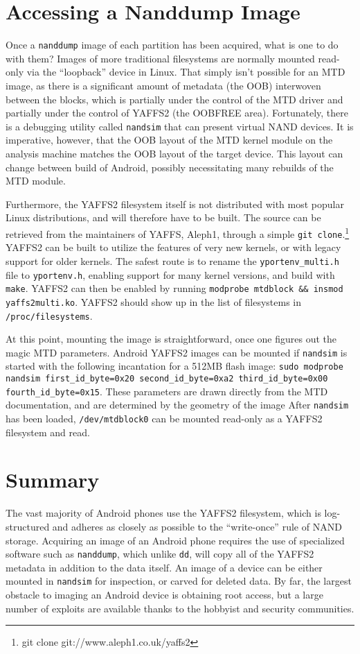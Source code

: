 \section{Accessing a Nanddump Image}

Once a \texttt{nanddump} image of each partition has been acquired, what is one to do with them?  Images of more traditional
filesystems are normally mounted read-only via the ``loopback'' device in Linux.  That simply isn't possible for an MTD image, as there
is a significant amount of metadata (the OOB) interwoven between the blocks, which is partially under the control of the MTD driver
and partially under the control of YAFFS2 (the OOBFREE area).  Fortunately, there is a debugging utility called \texttt{nandsim}
that can present virtual NAND devices.  It is imperative, however, that the OOB layout of the MTD kernel module on the analysis
machine matches the OOB layout of the target device.  This layout can change between build of Android, possibly necessitating many rebuilds of
the MTD module. 

Furthermore, the YAFFS2 filesystem itself is not distributed with most popular Linux distributions, and will therefore have to be built.
The source can be retrieved from the maintainers of YAFFS, Aleph1, through a simple \texttt{git clone}.\footnote{git clone git://www.aleph1.co.uk/yaffs2\cite{gityaffs}} YAFFS2 can be built to utilize the features of very new kernels, or with legacy support for older kernels. 
The safest route is to rename the \texttt{yportenv\_multi.h} file to \texttt{yportenv.h}, enabling support for many kernel versions, and build with \texttt{make}. 
YAFFS2 can then be enabled by running \texttt{modprobe mtdblock \&\& insmod yaffs2multi.ko}. 
YAFFS2 should show up in the list of filesystems in \texttt{/proc/filesystems}.

At this point, mounting the image is straightforward, once one figures out the magic MTD parameters.
Android YAFFS2 images can be mounted if \texttt{nandsim} is started with the following incantation for a 512MB flash image:
\texttt{sudo modprobe nandsim first\_id\_byte=0x20 second\_id\_byte=0xa2 third\_id\_byte=0x00 fourth\_id\_byte=0x15}.
These parameters are drawn directly from the MTD documentation, and are determined by the geometry of the image \cite{mtdfaq}
After \texttt{nandsim} has been loaded, \texttt{/dev/mtdblock0} can be mounted read-only as a YAFFS2 filesystem and read.

\section{Summary}

The vast majority of Android phones use the YAFFS2 filesystem, which is log-structured and adheres as closely as possible to the
``write-once'' rule of NAND storage. Acquiring an image of an Android phone requires the use of specialized software such as
\texttt{nanddump}, which unlike \texttt{dd}, will copy all of the YAFFS2 metadata in addition to the data itself. An image of a
device can be either mounted in \texttt{nandsim} for inspection, or carved for deleted data. By far, the largest obstacle to imaging
an Android device is obtaining root access, but a large number of exploits are available thanks to the hobbyist and security
communities.
